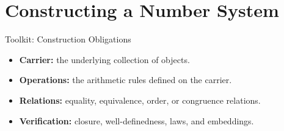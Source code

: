 \section{Constructing a Number System}
\begin{toolkitbox}{Toolkit: Construction Obligations}
\begin{itemize}
  \item \textbf{Carrier:} the underlying collection of objects.
  \item \textbf{Operations:} the arithmetic rules defined on the carrier.
  \item \textbf{Relations:} equality, equivalence, order, or congruence relations.
  \item \textbf{Verification:} closure, well-definedness, laws, and embeddings.
\end{itemize}
\end{toolkitbox}


